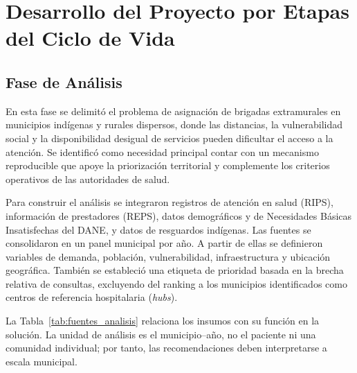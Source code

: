 \documentclass[12pt]{article}
\begin{document}
\section{Desarrollo del Proyecto por Etapas del Ciclo de Vida}

\subsection{Fase de Análisis}
En esta fase se delimitó el problema de asignación de brigadas extramurales en municipios indígenas y rurales dispersos, donde las distancias, la vulnerabilidad social y la disponibilidad desigual de servicios pueden dificultar el acceso a la atención. Se identificó como necesidad principal contar con un mecanismo reproducible que apoye la priorización territorial y complemente los criterios operativos de las autoridades de salud.

Para construir el análisis se integraron registros de atención en salud (RIPS), información de prestadores (REPS), datos demográficos y de Necesidades Básicas Insatisfechas del DANE, y datos de resguardos indígenas. Las fuentes se consolidaron en un panel municipal por año. A partir de ellas se definieron variables de demanda, población, vulnerabilidad, infraestructura y ubicación geográfica. También se estableció una etiqueta de prioridad basada en la brecha relativa de consultas, excluyendo del ranking a los municipios identificados como centros de referencia hospitalaria (\textit{hubs}).

La Tabla~\ref{tab:fuentes_analisis} relaciona los insumos con su función en la solución. La unidad de análisis es el municipio--año, no el paciente ni una comunidad individual; por tanto, las recomendaciones deben interpretarse a escala municipal.
\end{document}
